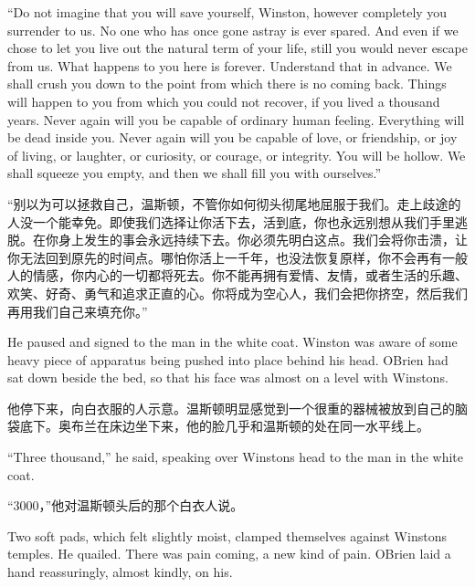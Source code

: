 \begin{paracol}{2}
\switchcolumn*

``Do not imagine that you will save yourself, Winston, however completely
you surrender to us. No one who has once gone astray is ever spared. And
even if we chose to let you live out the natural term of your life,
still you would never escape from us. What happens to you here is
forever. Understand that in advance. We shall crush you down to the
point from which there is no coming back. Things will happen to you from
which you could not recover, if you lived a thousand years. Never again
will you be capable of ordinary human feeling. Everything will be dead
inside you. Never again will you be capable of love, or friendship, or
joy of living, or laughter, or curiosity, or courage, or integrity. You
will be hollow. We shall squeeze you empty, and then we shall fill you
with ourselves.''

\switchcolumn

``别以为可以拯救自己，温斯顿，不管你如何彻头彻尾地屈服于我们。走上歧途的人没一个能幸免。即使我们选择让你活下去，活到底，你也永远别想从我们手里逃脱。在你身上发生的事会永远持续下去。你必须先明白这点。我们会将你击溃，让你无法回到原先的时间点。哪怕你活上一千年，也没法恢复原样，你不会再有一般人的情感，你内心的一切都将死去。你不能再拥有爱情、友情，或者生活的乐趣、欢笑、好奇、勇气和追求正直的心。你将成为空心人，我们会把你挤空，然后我们再用我们自己来填充你。''

\switchcolumn*

He paused and signed to the man in the white coat. Winston was aware of
some heavy piece of apparatus being pushed into place behind his head.
O\textquotesingle Brien had sat down beside the bed, so that his face
was almost on a level with Winston\textquotesingle s.

\switchcolumn

他停下来，向白衣服的人示意。温斯顿明显感觉到一个很重的器械被放到自己的脑袋底下。奥布兰在床边坐下来，他的脸几乎和温斯顿的处在同一水平线上。

\switchcolumn*

``Three thousand,'' he said, speaking over Winston\textquotesingle s head
to the man in the white coat.

\switchcolumn

``3000，''他对温斯顿头后的那个白衣人说。

\switchcolumn*

Two soft pads, which felt slightly moist, clamped themselves against
Winston\textquotesingle s temples. He quailed. There was pain coming, a
new kind of pain. O\textquotesingle Brien laid a hand reassuringly,
almost kindly, on his.


\end{paracol}
